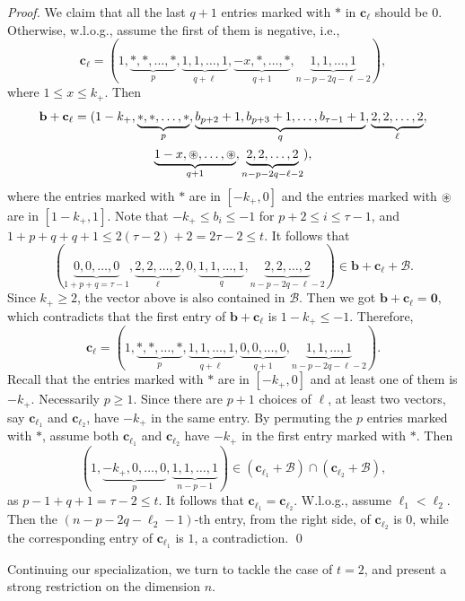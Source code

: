 \documentclass[sort&compress]{elsarticle}
\newcommand{\cB}{\mathcal{B}}
\renewcommand{\leq}{\leqslant}
\renewcommand{\geq}{\geqslant}
\newcommand{\vb}{\mathbf{b}}
\newcommand{\vc}{\mathbf{c}}
\newcommand{\Zero}{{\mathbf{0}}}
\newcommand{\kp}{k_+}
\begin{document}
\begin{proof}
  We claim that all the last $q+1$ entries marked with $*$ in
  $\vc_\ell$ should be $0$. Otherwise, w.l.o.g., assume the first of
  them is negative, i.e.,
  \[\vc_\ell =(1,\underbrace{*,*,\ldots,*}_p,\underbrace{1,1,\ldots,1}_{q+ \ell}, \underbrace{-x,*,\ldots,*}_{q+1}, \underbrace{1,1,\ldots,1}_{n-p-2q-\ell-2}),\]
  where $1 \leq x\leq \kp$.  Then
  \begin{multline*}
    \vb+\vc_\ell=(1-\kp,\underbrace{*,*,\ldots,*}_p,\underbrace{b_{p+2}+1, b_{p+3}+1,\ldots,b_{\tau-1}+1}_{q}, \underbrace{2,2,\ldots,2}_{\ell},
    \\
    \underbrace{1-x,\oast,\ldots,\oast}_{q+1}, \underbrace{2,2,\ldots,2}_{n-p-2q-\ell-2}),
  \end{multline*}
  where the entries marked with $*$ are in $[-\kp,0]$ and the entries marked with $\oast$ are in
  $[1-\kp,1]$.  Note that $-\kp\leq b_i \leq -1$ for $p+2 \leq i\leq
  \tau-1$, and $1+p+q+q+1 \leq 2(\tau-2)+2=2\tau-2\leq t$. It follows
  that
  \[ (\underbrace{0,0,\ldots,0}_{1+p+q = \tau-1}, \underbrace{2,2,\ldots,2}_\ell, 0, \underbrace{1,1,\ldots,1}_q, \underbrace{2,2,\ldots,2}_{n-p-2q-\ell-2} ) \in  \vb+\vc_\ell+\cB.\]
  Since $\kp\geq 2$, the vector above is also contained in $\cB$. Then
  we got $\vb+\vc_\ell=\Zero,$ which contradicts that the first entry
  of $\vb+\vc_\ell$ is $1-\kp\leq -1.$ Therefore,
  \[\vc_\ell =(1,\underbrace{*,*,\ldots,*}_p,\underbrace{1,1,\ldots,1}_{q+ \ell}, \underbrace{0,0,\ldots,0}_{q+1}, \underbrace{1,1,\ldots,1}_{n-p-2q-\ell-2}).\]
  Recall that the entries marked with $*$ are in $[-\kp,0]$ and at
  least one of them is $-\kp$. Necessarily $p\geq 1$. Since there are
  $p+1$ choices of $\ell$, at least two vectors, say $\vc_{\ell_1}$
  and $\vc_{\ell_2}$, have $-\kp$ in the same entry. By permuting the
  $p$ entries marked with $*$, assume both $\vc_{\ell_1}$ and
  $\vc_{\ell_2}$ have $-\kp$ in the first entry marked with $*$.  Then
  \[ (1,\underbrace{-\kp,0,\ldots,0}_p,\underbrace{1,1,\ldots,1}_{n-p-1}) \in (\vc_{\ell_1}+\cB)\cap (\vc_{\ell_2}+\cB), \]
  as $p-1+q+1=\tau-2 \leq t$.  It follows that
  $\vc_{\ell_1}=\vc_{\ell_2}$.  W.l.o.g., assume $\ell_1 <
  \ell_2$. Then the $(n-p-2q-\ell_2-1)$-th entry, from the right side,
  of $\vc_{\ell_2}$ is $0$, while the corresponding entry of
  $\vc_{\ell_1}$ is $1$, a contradiction. \qed\end{proof}

  Continuing our specialization, we turn to tackle the case of $t=2$,
  and present a strong restriction on the dimension $n$.
  
\end{document}
